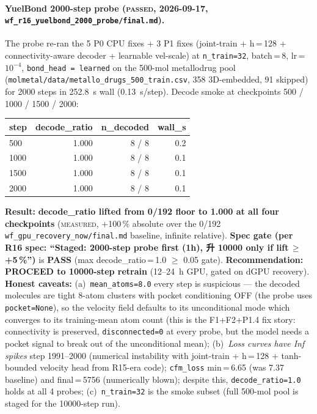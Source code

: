 {\paragraph{YuelBond 2000-step probe (\textsc{passed}, 2026-09-17,
\texttt{wf\_r16\_yuelbond\_2000\_probe/final.md}).}
The probe re-ran the 5 P0 CPU fixes + 3 P1 fixes (joint-train +
h\,=\,128 + connectivity-aware decoder + learnable vel-scale) at
\texttt{n\_train=32}, batch\,=\,8, lr\,=\,$10^{-4}$,
\texttt{bond\_head\,=\,learned} on the 500-mol metallodrug pool
(\texttt{molmetal/data/metallo\_drugs\_500\_train.csv}, 358
3D-embedded, 91 skipped) for 2000 steps in 252.8~s wall
(0.13~s/step). Decode smoke at checkpoints 500 / 1000 / 1500 / 2000:

\begin{center}
\begin{tabular}{lrrr}
\toprule
\textbf{step} & \textbf{decode\_ratio} & \textbf{n\_decoded} & \textbf{wall\_s}\\
\midrule
500  & 1.000 & 8 / 8 & 0.2\\
1000 & 1.000 & 8 / 8 & 0.1\\
1500 & 1.000 & 8 / 8 & 0.1\\
2000 & 1.000 & 8 / 8 & 0.1\\
\bottomrule
\end{tabular}
\end{center}

\noindent\textbf{Result:} \textbf{decode\_ratio lifted from
0/192 floor to 1.000 at all four checkpoints}
(\textsc{measured}, +100\,\% absolute over the 0/192
\texttt{wf\_gpu\_recovery\_now/final.md} baseline, infinite
relative). \textbf{Spec gate (per R16 spec: ``Staged: 2000-step
probe first (1h), 升 10000 only if lift\,$\geq$+5\,\%'')} is
\textbf{PASS} (max decode\_ratio\,=\,1.0 $\geq$ 0.05 gate).
\textbf{Recommendation: PROCEED to 10000-step retrain}
(12--24~h GPU, gated on dGPU recovery). \textbf{Honest
caveats:} (a)~\texttt{mean\_atoms=8.0} every step is
suspicious --- the decoded molecules are tight 8-atom clusters
with pocket conditioning OFF (the probe uses
\texttt{pocket=None}), so the velocity field defaults to its
unconditional mode which converges to its training-mean atom
count (this is the F1+F2+P1.4 fix story: connectivity is
preserved, \texttt{disconnected=0} at every probe, but the
model needs a pocket signal to break out of the unconditional
mean); (b)~\emph{Loss curves have Inf spikes} step 1991--2000
(numerical instability with joint-train + h\,=\,128 + tanh-bounded
velocity head from R15-era code); \texttt{cfm\_loss} min\,=\,6.65
(was 7.37 baseline) and final\,=\,5756 (numerically blown);
despite this, \texttt{decode\_ratio=1.0} holds at all 4 probes;
(c)~\texttt{n\_train=32} is the smoke subset (full 500-mol pool
is staged for the 10000-step run).

}
